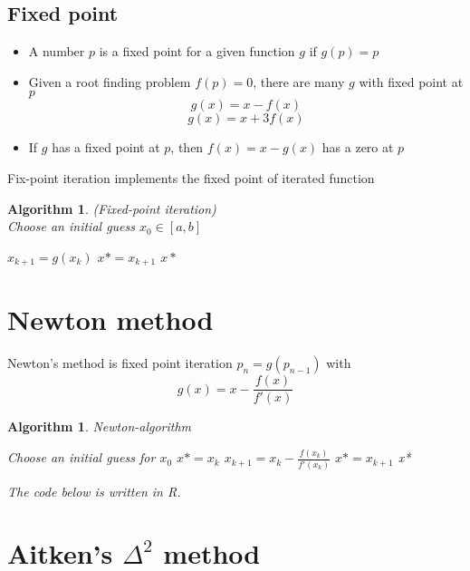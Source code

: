 \documentclass[12pt]{article}
\newtheorem{alg}[theorem]{Algorithm}
\begin{document}
\subsection{Fixed point} \begin{itemize}
	\item A number $p$ is a fixed point for a given function $g$ if $g(p) = p$
	\item Given a root finding problem $f(p) = 0$, there are many $g$ with fixed point at $p$
	$$g(x) = x - f(x)$$ $$g(x) = x + 3f(x)$$
	\item If $g$ has a fixed point at $p$, then $f(x) = x -g(x)$ has a zero at $p$
\end{itemize}
Fix-point iteration implements the fixed point of iterated function \\ 
\begin{alg}(Fixed-point iteration) \\
Choose an initial guess $x_0 \in [a,b]$
\begin{algorithmic}
\State $x_{k+1} = g(x_k)$
\State $x* = x_{k+1}$
\State \Return $x*$
\EndIf
\EndFor
\end{algorithmic}

\end{alg}



\section{Newton method}
Newton's method is fixed point iteration $p_n = g(p_{n-1})$ with $$g(x) = x - \frac{f(x)}{f'(x)}$$
\begin{alg}{Newton-algorithm}
\begin{algorithmic}
Choose an initial guess for $x_0$
\State $x* = x_{k}$
\State $x_{k+1} = x_k - \frac{f(x_k)}{f'(x_k)}$
\State $x* = x_{k+1}$
\State \Return x*
\EndIf
\EndFor	
\end{algorithmic}
The code below is written in R.
	
\end{alg}

\section{Aitken's $\Delta^2$ method}
\end{document}
